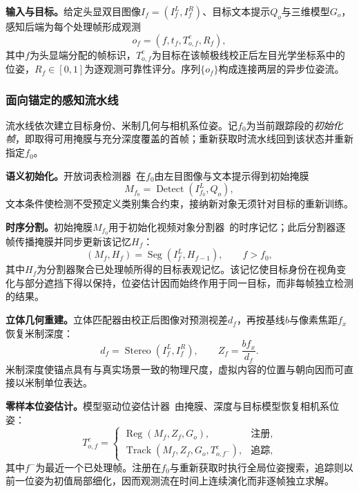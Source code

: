 \documentclass[review]{vgtc}
\begin{document}
\textbf{输入与目标。}给定头显双目图像$I_f = (I_f^L, I_f^R)$、目标文本提示$Q_o$与三维模型$G_o$，感知后端为每个处理帧形成观测
\begin{equation}
o_f = (f, t_f, T_{o,f}^{c}, R_f),
\label{eq:observation}
\end{equation}
其中$f$为头显端分配的帧标识，$T_{o,f}^{c}$为目标在该帧极线校正后左目光学坐标系中的位姿，$R_f \in [0,1]$为逐观测可靠性评分。序列$\{o_f\}$构成连接两层的异步位姿流。

\subsubsection{面向锚定的感知流水线}

流水线依次建立目标身份、米制几何与相机系位姿。记$f_0$为当前跟踪段的\emph{初始化帧}，即取得可用掩膜与充分深度覆盖的首帧；重新获取时流水线回到该状态并重新指定$f_0$。

\textbf{语义初始化。}开放词表检测器~\cite{yoloe2025}在$f_0$由左目图像与文本提示得到初始掩膜
\begin{equation}
M_{f_0} = \operatorname{Detect}(I_{f_0}^{L}, Q_o),
\label{eq:detect}
\end{equation}
文本条件使检测不受预定义类别集合约束，接纳新对象无须针对目标的重新训练。

\textbf{时序分割。}初始掩膜$M_{f_0}$用于初始化视频对象分割器~\cite{cutie2024}的时序记忆；此后分割器逐帧传播掩膜并同步更新该记忆$H_f$：
\begin{equation}
(M_f, H_f) = \operatorname{Seg}(I_f^{L}, H_{f-1}), \qquad f > f_0,
\label{eq:seg}
\end{equation}
其中$H_f$为分割器聚合已处理帧所得的目标表观记忆。该记忆使目标身份在视角变化与部分遮挡下得以保持，位姿估计因而始终作用于同一目标，而非每帧独立检测的结果。

\textbf{立体几何重建。}立体匹配器由校正后图像对预测视差$d_f$，再按基线$b$与像素焦距$f_x$恢复米制深度：
\begin{equation}
d_f = \operatorname{Stereo}(I_f^{L}, I_f^{R}), \qquad Z_f = \frac{b f_x}{d_f}.
\label{eq:depth}
\end{equation}
米制深度使锚点具有与真实场景一致的物理尺度，虚拟内容的位置与朝向因而可直接以米制单位表达。

\textbf{零样本位姿估计。}模型驱动位姿估计器~\cite{foundationpose2023}由掩膜、深度与目标模型恢复相机系位姿：
\begin{equation}
T_{o,f}^{c} =
\begin{cases}
\operatorname{Reg}(M_f, Z_f, G_o), & \text{注册}, \\
\operatorname{Track}(M_f, Z_f, G_o, T_{o,f^-}^{c}), & \text{追踪},
\end{cases}
\label{eq:pose}
\end{equation}
其中$f^-$为最近一个已处理帧。注册在$f_0$与重新获取时执行全局位姿搜索，追踪则以前一位姿为初值局部细化，因而观测流在时间上连续演化而非逐帧独立求解。
\end{document}
